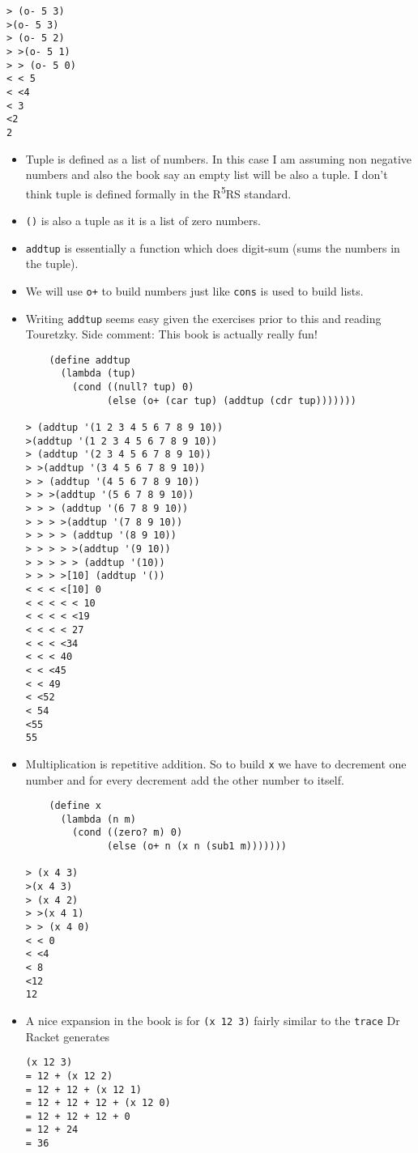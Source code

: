 \documentclass[11pt]{article}
\begin{document}
\begin{verbatim}
> (o- 5 3)
>(o- 5 3)
> (o- 5 2)
> >(o- 5 1)
> > (o- 5 0)
< < 5
< <4
< 3
<2
2

\end{verbatim}
\begin{itemize}
\item Tuple is defined as a list of numbers. In this case I am assuming non negative numbers and also the book say an empty list will be also a
tuple. I don't think tuple is defined formally in the R\textsuperscript{5}RS standard.
\item \texttt{()} is also a tuple as it is a list of zero numbers.
\item \texttt{addtup} is essentially a function which does digit-sum (sums the numbers in the tuple).
\item We will use \texttt{o+} to build numbers just like \texttt{cons} is used to build lists.
\item Writing \texttt{addtup} seems easy given the exercises prior to this and reading Touretzky. Side comment: This book is actually really fun!
\begin{verbatim}
    (define addtup
      (lambda (tup)
        (cond ((null? tup) 0)
              (else (o+ (car tup) (addtup (cdr tup)))))))

> (addtup '(1 2 3 4 5 6 7 8 9 10))
>(addtup '(1 2 3 4 5 6 7 8 9 10))
> (addtup '(2 3 4 5 6 7 8 9 10))
> >(addtup '(3 4 5 6 7 8 9 10))
> > (addtup '(4 5 6 7 8 9 10))
> > >(addtup '(5 6 7 8 9 10))
> > > (addtup '(6 7 8 9 10))
> > > >(addtup '(7 8 9 10))
> > > > (addtup '(8 9 10))
> > > > >(addtup '(9 10))
> > > > > (addtup '(10))
> > > >[10] (addtup '())
< < < <[10] 0
< < < < < 10
< < < < <19
< < < < 27
< < < <34
< < < 40
< < <45
< < 49
< <52
< 54
<55
55

\end{verbatim}
\item Multiplication is repetitive addition. So to build \texttt{x} we have to decrement one number and for every decrement add the other number to itself.
\begin{verbatim}
    (define x
      (lambda (n m)
        (cond ((zero? m) 0)
              (else (o+ n (x n (sub1 m)))))))

> (x 4 3)
>(x 4 3)
> (x 4 2)
> >(x 4 1)
> > (x 4 0)
< < 0
< <4
< 8
<12
12

\end{verbatim}
\item A nice expansion in the book is for \texttt{(x 12 3)} fairly similar to the \texttt{trace} Dr Racket generates
\begin{verbatim}
(x 12 3)
= 12 + (x 12 2)
= 12 + 12 + (x 12 1)
= 12 + 12 + 12 + (x 12 0)
= 12 + 12 + 12 + 0
= 12 + 24
= 36


\end{verbatim}
\end{itemize}
\end{document}
